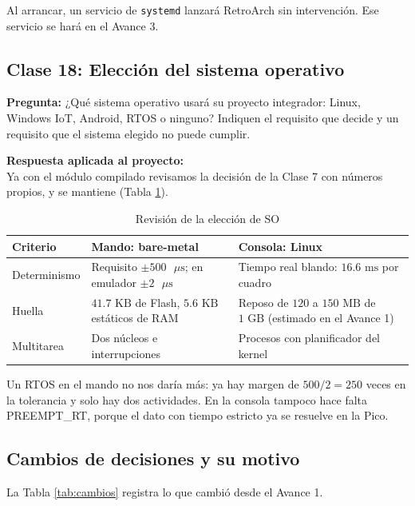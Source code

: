 Al arrancar, un servicio de \texttt{systemd} lanzará RetroArch sin intervención. Ese servicio se hará en el Avance 3.

\subsection{Clase 18: Elección del sistema operativo}

\textbf{Pregunta:} ¿Qué sistema operativo usará su proyecto integrador: Linux, Windows IoT, Android, RTOS o ninguno? Indiquen el requisito que decide y un requisito que el sistema elegido no puede cumplir.

\textbf{Respuesta aplicada al proyecto:} \\
Ya con el módulo compilado revisamos la decisión de la Clase 7 con números propios, y se mantiene (Tabla \ref{tab:eleccion_so}).

\begin{table}[H]
	\centering
	\caption{Revisión de la elección de SO}
	\label{tab:eleccion_so}
	\small
	\begin{tabular}{|p{1.8cm}|p{2.75cm}|p{2.75cm}|}
		\hline
		\textbf{Criterio} & \textbf{Mando: bare-metal} & \textbf{Consola: Linux} \\
		\hline
		Determinismo & Requisito $\pm 500\text{ }\mu\text{s}$; en emulador $\pm 2\text{ }\mu\text{s}$ & Tiempo real blando: $16.6\text{ ms}$ por cuadro \\
		\hline
		Huella & $41.7\text{ KB}$ de Flash, $5.6\text{ KB}$ estáticos de RAM & Reposo de $120$ a $150\text{ MB}$ de $1\text{ GB}$ (estimado en el Avance 1) \\
		\hline
		Multitarea & Dos núcleos e interrupciones & Procesos con planificador del kernel \\
		\hline
	\end{tabular}
\end{table}

Un RTOS en el mando no nos daría más: ya hay margen de $500 / 2 = 250$ veces en la tolerancia y solo hay dos actividades. En la consola tampoco hace falta PREEMPT\_RT, porque el dato con tiempo estricto ya se resuelve en la Pico.

\subsection{Cambios de decisiones y su motivo}

La Tabla \ref{tab:cambios} registra lo que cambió desde el Avance 1.

